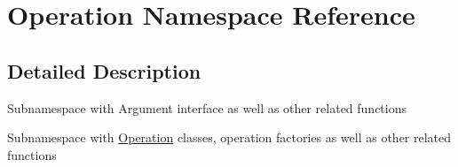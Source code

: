 \hypertarget{namespace_operation}{}\section{Operation Namespace Reference}
\label{namespace_operation}


\subsection{Detailed Description}
Subnamespace with Argument interface as well as other related functions

Subnamespace with \mbox{\hyperlink{namespace_operation}{Operation}} classes, operation factories as well as other related functions 